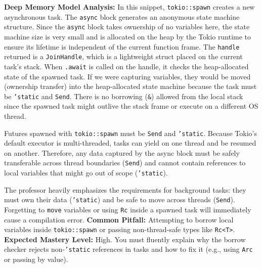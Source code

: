 \textbf{Deep Memory Model Analysis:}
In this snippet, \texttt{tokio::spawn} creates a new asynchronous task. The \texttt{async} block generates an anonymous state machine structure. Since the \texttt{async} block takes ownership of no variables here, the state machine size is very small and is allocated on the heap by the Tokio runtime to ensure its lifetime is independent of the current function frame. The \texttt{handle} returned is a \texttt{JoinHandle}, which is a lightweight struct placed on the current task's stack. When \texttt{.await} is called on the handle, it checks the heap-allocated state of the spawned task. If we were capturing variables, they would be moved (ownership transfer) into the heap-allocated state machine because the task must be \texttt{'static} and \texttt{Send}. There is no borrowing (\texttt{\&}) allowed from the local stack since the spawned task might outlive the stack frame or execute on a different OS thread.


\begin{warningbox}
Futures spawned with \texttt{tokio::spawn} must be \texttt{Send} and \texttt{'static}. Because Tokio's default executor is multi-threaded, tasks can yield on one thread and be resumed on another. Therefore, any data captured by the async block must be safely transferable across thread boundaries (\texttt{Send}) and cannot contain references to local variables that might go out of scope (\texttt{'static}).
\end{warningbox}

\begin{examprioritybox}
The professor heavily emphasizes the requirements for background tasks: they must own their data (\texttt{'static}) and be safe to move across threads (\texttt{Send}). Forgetting to \texttt{move} variables or using \texttt{Rc} inside a spawned task will immediately cause a compilation error.
\textbf{Common Pitfall:} Attempting to borrow local variables inside \texttt{tokio::spawn} or passing non-thread-safe types like \texttt{Rc<T>}.
\textbf{Expected Mastery Level:} High. You must fluently explain why the borrow checker rejects non-\texttt{'static} references in tasks and how to fix it (e.g., using \texttt{Arc} or passing by value).
\end{examprioritybox}


